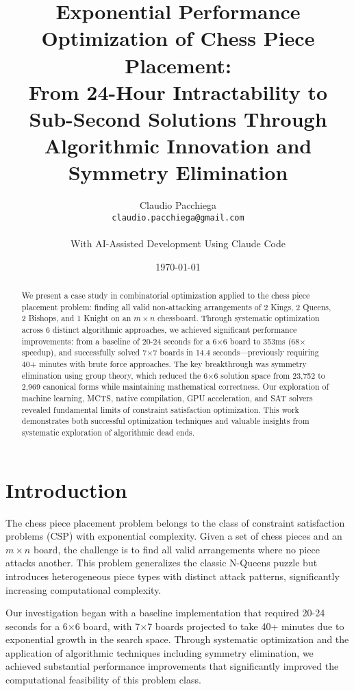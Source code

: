 \documentclass[12pt,a4paper]{article}
\title{Exponential Performance Optimization of Chess Piece Placement:\\
From 24-Hour Intractability to Sub-Second Solutions Through\\
Algorithmic Innovation and Symmetry Elimination}
\author{Claudio Pacchiega\\
\texttt{claudio.pacchiega@gmail.com}\\
\\
\small{With AI-Assisted Development Using Claude Code}}
\date{\today}
\theoremstyle{definition}
\begin{document}
\maketitle

\begin{abstract}
We present a case study in combinatorial optimization applied to the chess piece placement problem: finding all valid non-attacking arrangements of 2 Kings, 2 Queens, 2 Bishops, and 1 Knight on an $m \times n$ chessboard. Through systematic optimization across 6 distinct algorithmic approaches, we achieved significant performance improvements: from a baseline of 20-24 seconds for a 6$\times$6 board to 353ms (68$\times$ speedup), and successfully solved 7$\times$7 boards in 14.4 seconds—previously requiring 40+ minutes with brute force approaches. The key breakthrough was symmetry elimination using group theory, which reduced the 6$\times$6 solution space from 23,752 to 2,969 canonical forms while maintaining mathematical correctness. Our exploration of machine learning, MCTS, native compilation, GPU acceleration, and SAT solvers revealed fundamental limits of constraint satisfaction optimization. This work demonstrates both successful optimization techniques and valuable insights from systematic exploration of algorithmic dead ends.
\end{abstract}

\section{Introduction}

The chess piece placement problem belongs to the class of constraint satisfaction problems (CSP) with exponential complexity. Given a set of chess pieces and an $m \times n$ board, the challenge is to find all valid arrangements where no piece attacks another. This problem generalizes the classic N-Queens puzzle but introduces heterogeneous piece types with distinct attack patterns, significantly increasing computational complexity.

Our investigation began with a baseline implementation that required 20-24 seconds for a 6$\times$6 board, with 7$\times$7 boards projected to take 40+ minutes due to exponential growth in the search space. Through systematic optimization and the application of algorithmic techniques including symmetry elimination, we achieved substantial performance improvements that significantly improved the computational feasibility of this problem class.
\end{document}
